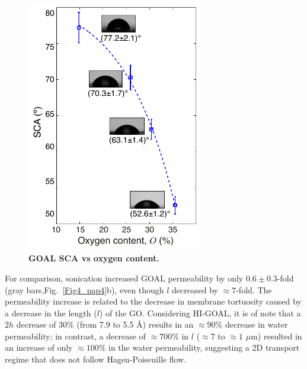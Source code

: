 \begin{figure}[h!]
  \centering
  \includegraphics[width=3in]{paper4/Fig5.pdf}
  \caption{\textbf{GOAL SCA vs oxygen content.}}
  \label{Fig5_pap4}
\end{figure}
For comparison, sonication increased GOAL permeability by only $0.6\pm0.3$-fold (gray bars,Fig.~\ref{Fig4_pap4}b), even though $l$ decreased by $\approx7$-fold. The permeability increase is related to the decrease in membrane tortuosity caused by a decrease in the length ($l$) of the GO. Considering HI-GOAL, it is of note that a $2h$ decrease of 30\% (from 7.9 to 5.5 {\AA}) results in an $\approx90$\% decrease in water permeability; in contrast, a decrease of $\approx700$\% in $l$ ($\approx7$ to $\approx1$ $\mu$m) resulted in an increase of only $\approx100$\% in the water permeability, suggesting a 2D transport regime that does not follow Hagen-Poiseuille flow.\\
